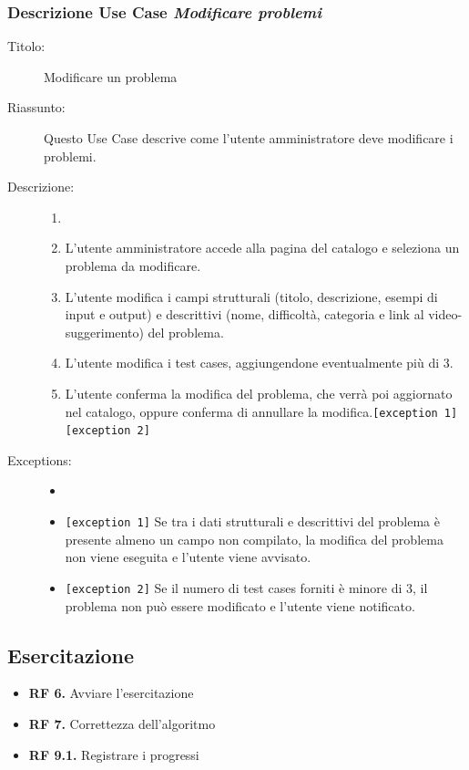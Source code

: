 \documentclass[11pt, a4paper]{article}
\theoremstyle{definition} %
\begin{document}
\subsubsection*{Descrizione Use Case \textit{Modificare problemi}}
\begin{description}
    \item[Titolo:] Modificare un problema
    
    \item[Riassunto:] Questo Use Case descrive come l'utente amministratore
    deve modificare i problemi.

    \item[Descrizione:]
    \begin{enumerate}
        \item[]
        \item L'utente amministratore accede alla pagina del catalogo e seleziona un problema da modificare.
        \item L'utente modifica i campi strutturali (titolo, descrizione, esempi di input e output) e descrittivi (nome, difficoltà, categoria e link al video-suggerimento) del problema.
        \item L'utente modifica i test cases, aggiungendone eventualmente più di 3.
        \item L'utente conferma la modifica del problema, che verrà poi aggiornato nel catalogo, oppure conferma di annullare la modifica.\texttt{[exception 1]} \texttt{[exception 2]}
    \end{enumerate}
    
    \item[Exceptions:]
    \begin{itemize}
        \item[]
        \item \texttt{[exception 1]} Se tra i dati strutturali e descrittivi del problema è presente almeno un campo non compilato, la modifica del problema non viene eseguita e l'utente viene avvisato.
        \item \texttt{[exception 2]} Se il numero di test cases forniti è minore di 3, il problema non può essere modificato e l'utente viene notificato.
    \end{itemize}
\end{description}

\newpage
\subsection{Esercitazione}
\begin{itemize}
    \item \textbf{RF 6.} Avviare l'esercitazione
    \item \textbf{RF 7.} Correttezza dell'algoritmo
    \item \textbf{RF 9.1.} Registrare i progressi
\end{itemize}
\end{document}
